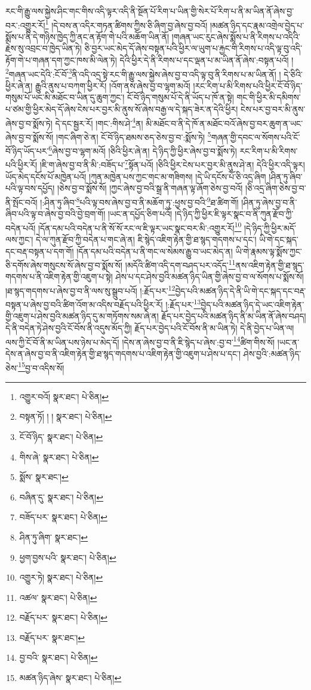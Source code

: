 རང་གི་རྒྱུ་ལས་སྐྱེས་ཤིང་གང་གིས་འདི་ལྟར་འདི་ནི་སྔོན་པོ་རིག་པ་ཡིན་གྱི་སེར་པོ་རིག་པ་ནི་མ་ཡིན་ནོ་ཞེས་བྱ་བར་:འགྱུར་རོ།\footnote{འགྱུར་བའོ།  སྣར་ཐང་།  པེ་ཅིན། } །དེ་བས་ན་འདིར་གཏན་ཚིགས་ཀྱིས་ཅི་ཞིག་བྱ་ཞེས་བྱ་བའོ། །མཚན་ཉིད་དང་རྣམ་འགྲེལ་བྱེད་པ་སྨོས་པ་ནི་དེ་གཉིས་ཁྱེད་ཀྱི་ནང་ན་རྟོག་གེ་པའི་མཆོག་ཡིན་ནོ། །གཞན་ཡང་རུང་ཞེས་སྨོས་པ་ནི་རིགས་པ་འདིའི་རྗེས་སུ་འབྲང་བ་ཁྱེད་ཡིན་ཏེ། ཅི་བྱར་ཡང་མེད་དོ་ཞེས་བསྟན་པའི་ཕྱིར་ལ་ཡུག་པ་རྐྱང་གི་རིགས་པ་འདི་ལྟ་བུ་འདི་རྟོག་གེ་པ་གཞན་དག་ཀྱང་ཁས་མི་ལེན་ཏེ། དེའི་ཕྱིར་དེ་ནི་རིགས་པ་དང་ལྡན་པ་མ་ཡིན་ནོ་ཞེས་:བསྟན་པའོ། །\footnote{བསྟན་ཏོ། ། །  སྣར་ཐང་།  པེ་ཅིན། }གཞན་ཡང་དེའི་:ངོ་བོ་\footnote{ངོ་བོ་ཉིད་  སྣར་ཐང་།  པེ་ཅིན། }ནི་འདི་འདྲ་སྟེ་རང་གི་རྒྱུ་ལས་སྐྱེས་ཞེས་བྱ་བ་འདི་ལྟ་བུ་ནི་རིགས་པ་མ་ཡིན་ནོ། །
དེ་ཅིའི་ཕྱིར་ཞེ་ན། རྒྱུའི་ནུས་པ་བཀག་ཕྱིར་རོ། །འོག་ནས་ཞེས་བྱ་བ་ལྷག་མའོ། །རང་རིག་པ་མི་རིགས་པའི་ཕྱིར་ངོ་བོ་ཉིད་གསུམ་པོ་ཡང་མི་མཐོང་བ་ཡིན་དུ་ཆུག་ཀྱང་། ངོ་བོ་ཉིད་གསུམ་པོ་དེ་ནི་ཡོད་པ་ཁོ་ན་སྟེ། གང་གི་ཕྱིར་མི་དམིགས་པ་ཙམ་གྱི་ཕྱིར་མེད་དོ་ཞེས་ངེས་པར་བྱར་མི་ནུས་སོ་ཞེས་བརྒྱ་ལ་དེ་སྐད་ཟེར་ན་དེའི་ཕྱིར། ངེས་པར་བྱ་བར་མི་ནུས་ཞེས་བྱ་བ་སྨོས་ཏེ། དེ་དང་སྦྱར་རོ། །གང་:གིས་ཤེ་\footnote{གིས་ཞེ་  སྣར་ཐང་།  པེ་ཅིན། }ན། མི་མཐོང་བ་ནི་དེ་ཁོ་ན་མཐོང་བའོ་ཞེས་བྱ་བར་ཆུག་ན་ཡང་ཞེས་བྱ་བ་སྨོས་སོ། །གང་ཞིག་ཅེ་ན། ངོ་བོ་ཉིད་ཐམས་ཅད་ཅེས་བྱ་བ་:སྨོས་ཏེ། \footnote{སྨོས་  སྣར་ཐང་། }གཞན་གྱི་དབང་ལ་སོགས་པའི་ངོ་བོ་ཉིད་ཡོད་པར་\footnote{བཞིན་དུ་  སྣར་ཐང་།  པེ་ཅིན། }ཞེས་བྱ་བ་ལྷག་མའོ། །ཅིའི་ཕྱིར་ཞེ་ན། དེ་ཉིད་ཀྱི་ཕྱིར་ཞེས་བྱ་བ་སྨོས་ཏེ། རང་རིག་པ་མི་རིགས་པའི་ཕྱིར་རོ། །ཇི་ག་ཞེས་བྱ་བ་ནི་མི་:བཟོད་པ་\footnote{བཟོད་པར་  སྣར་ཐང་།  པེ་ཅིན། }སྟོན་པའོ། །ཅིའི་ཕྱིར་ངེས་པར་བྱར་མི་ནུས་ཤེ་ན། དེའི་ཕྱིར་འདི་ལྟར། ཡོད་མེད་དངོས་པོ་མཁྱེན་པའོ། །ཀུན་མཁྱེན་པས་ཀྱང་གང་མ་གཟིགས། །དེ་ཡི་དངོས་པོ་ཅི་འདྲ་ཞིག །ཤིན་ཏུ་ཞིབ་པའི་ལྟ་བས་དཔྱོད། །ཅེས་བྱ་བ་སྨོས་སོ། །ཀྱང་ཞེས་བྱ་བའི་སྒྲ་ནི་གཞན་ལྟ་ཞོག་ཅེས་བྱ་བའོ། །ཅི་འདྲ་ཞིག་ཅེས་བྱ་བ་ནི་སྤོང་བའོ། །:ཤིན་ཏུ་ཞིབ་\footnote{ཤིན་ཏུ་ཞིག་  སྣར་ཐང་། }པའི་ལྟ་བས་ཞེས་བྱ་བ་ནི་མཆོག་ཏུ་:ཕྱས་བྱ་བའི་\footnote{ཕྱག་བྱས་པའི་  སྣར་ཐང་།  པེ་ཅིན། }ཐ་ཚིག་གོ། །ཤིན་ཏུ་ཞེས་བྱ་བ་ནི་ཞིབ་པའི་ལྟ་བ་ཞེས་བྱ་བའི་བྱེ་བྲག་གོ། །ཡང་ན་དཔྱོད་ཅིག་པའོ། །དེ་ཉིད་ཀྱི་ཕྱིར་ཇི་ལྟར་སྣང་བ་ནི་ཀུན་རྫོབ་ཀྱི་བདེན་པའོ། །དོན་དམ་པའི་བདེན་པ་ནི་སོ་སོ་རང་ལ་ཇི་ལྟར་ཡང་སྣང་བར་མི་:འགྱུར་རོ།\footnote{འགྱུར་ཏེ།  སྣར་ཐང་།  པེ་ཅིན། } །དེ་ཉིད་ཀྱི་ཕྱིར་མདོ་ལས་ཀྱང་། དེ་ལ་ཀུན་རྫོབ་ཀྱི་བདེན་པ་གང་ཞེ་ན། ཇི་སྙེད་འཇིག་རྟེན་གྱི་ཐ་སྙད་གདགས་པ་དང་། ཡི་གེ་དང་སྐད་དང་བརྡ་བསྟན་པ་དག་གོ། །དོན་དམ་པའི་བདེན་པ་ནི་གང་ལ་སེམས་རྒྱུ་བ་ཡང་མེད་ན། ཡི་གེ་རྣམས་ལྟ་སྨོས་ཀྱང་ཅི་དགོས་ཞེས་གསུངས་སོ་ཞེས་བྱ་བ་སྨོས་སོ། །མདོའི་ཚིག་འདི་དག་བཤད་པར་འདོད་\footnote{འཚལ་  སྣར་ཐང་།  པེ་ཅིན། }ནས་འཇིག་རྟེན་གྱི་ཐ་སྙད་གདགས་པ་ནི་འཇིག་རྟེན་གྱི་འཇུག་པ་སྟེ། ཤེས་པ་དང་ཤེས་བྱའི་མཚན་ཉིད་ཡིན་གྱི་ཞེས་བྱ་བ་ལ་སོགས་པ་སྨོས་སོ། །ཐ་སྙད་གདགས་པ་ཞེས་བྱ་བ་ནི་ལས་སུ་སྒྲུབ་པའོ། །:རྗོད་པར་\footnote{བརྗོད་པར་  སྣར་ཐང་།  པེ་ཅིན། }བྱེད་པའི་མཚན་ཉིད་དེ་ནི་ཡི་གེ་དང་སྐད་དང་བརྡ་བསྟན་པ་ཞེས་བྱ་བའི་ཚིག་འོག་མ་འདིས་བརྗོད་པའི་ཕྱིར་རོ། །:རྗོད་པར་\footnote{བརྗོད་པར་  སྣར་ཐང་། }བྱེད་པའི་མཚན་ཉིད་དེ་ཡང་འཇིག་རྟེན་གྱི་འཇུག་པ་ཤེས་བྱའི་མཚན་ཉིད་དུ་མ་གཏོགས་སམ་ཞེ་ན། རྗོད་པར་བྱེད་པའི་མཚན་ཉིད་ནི་མ་ཡིན་ནོ་ཞེས་བཤད། དེ་ནི་བདེན་ཏེ་ཤེས་བྱའི་ངོ་བོས་ནི་འདུས་མོད་ཀྱི། རྗོད་པར་བྱེད་པའི་ངོ་བོས་ནི་མ་ཡིན་ཏེ། དེ་ནི་བྱེད་པ་ཡིན་ལ། ལས་ཀྱི་ངོ་བོ་ནི་མ་ཡིན་པས་ཉེས་པ་མེད་དོ། །དེས་ན་ཞེས་བྱ་བ་ནི་ཇི་སྙེད་པ་ཞེས་:བྱ་བ་\footnote{བྱ་བའི་  སྣར་ཐང་།  པེ་ཅིན། }ཚིག་གིས་སོ། །ཡང་ན་དེས་ན་ཞེས་བྱ་བ་ནི་འཇིག་རྟེན་གྱི་ཐ་སྙད་གདགས་པ་འཇིག་རྟེན་གྱི་འཇུག་པ་ཤེས་པ་དང་། ཤེས་བྱའི་:མཚན་ཉིད་ཅེས་\footnote{མཚན་ཉིད་ཞེས་  སྣར་ཐང་།  པེ་ཅིན། }བྱ་བ་འདིས་སོ། 
